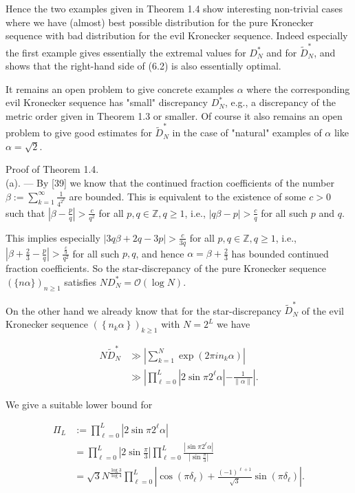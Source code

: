 \documentclass[10pt]{article}
\begin{document}
Hence the two examples given in Theorem 1.4 show interesting non-trivial cases where we have (almost) best possible distribution for the pure Kronecker sequence with bad distribution for the evil Kronecker sequence. Indeed especially the first example gives essentially the extremal values for $D_{N}^{*}$ and for $\widetilde{D}_{N}^{*}$, and shows that the right-hand side of (6.2) is also essentially optimal.

It remains an open problem to give concrete examples $\alpha$ where the corresponding evil Kronecker sequence has "small" discrepancy $D_{N}^{*}$, e.g., a discrepancy of the metric order given in Theorem 1.3 or smaller. Of course it also remains an open problem to give good estimates for $\widetilde{D}_{N}^{*}$ in the case of "natural" examples of $\alpha$ like $\alpha=\sqrt{2}$.

Proof of Theorem 1.4.\\[0pt]
(a). — By [39] we know that the continued fraction coefficients of the number $\beta:=\sum_{k=1}^{\infty} \frac{1}{4^{2^{k}}}$ are bounded. This is equivalent to the existence of some $c>0$ such that $\left|\beta-\frac{p}{q}\right|>\frac{c}{q^{2}}$ for all $p, q \in \mathbb{Z}, q \geqslant 1$, i.e., $|q \beta-p|>\frac{c}{q}$ for all such $p$ and $q$.

This implies especially $|3 q \beta+2 q-3 p|>\frac{c}{3 q}$ for all $p, q \in \mathbb{Z}, q \geqslant 1$, i.e., $\left|\beta+\frac{2}{3}-\frac{p}{q}\right|>\frac{\frac{c}{9}}{q^{2}}$ for all such $p, q$, and hence $\alpha=\beta+\frac{2}{3}$ has bounded continued fraction coefficients. So the star-discrepancy of the pure Kronecker sequence $(\{n \alpha\})_{n \geqslant 1}$ satisfies $N D_{N}^{*}=\mathcal{O}(\log N)$.

On the other hand we already know that for the star-discrepancy $\widetilde{D}_{N}^{*}$ of the evil Kronecker sequence $\left(\left\{n_{k} \alpha\right\}\right)_{k \geqslant 1}$ with $N=2^{L}$ we have

$$
\begin{aligned}
N \widetilde{D}_{N}^{*} & \gg\left|\sum_{k=1}^{N} \exp \left(2 \pi i n_{k} \alpha\right)\right| \\
& \gg\left|\prod_{\ell=0}^{L}\right| 2 \sin \pi 2^{\ell} \alpha\left|-\frac{1}{\|\alpha\|}\right| .
\end{aligned}
$$

We give a suitable lower bound for

$$
\begin{aligned}
\Pi_{L} & :=\prod_{\ell=0}^{L}\left|2 \sin \pi 2^{\ell} \alpha\right| \\
& =\prod_{\ell=0}^{L}\left|2 \sin \frac{\pi}{3}\right| \prod_{\ell=0}^{L} \frac{\left|\sin \pi 2^{\ell} \alpha\right|}{\left|\sin \frac{\pi}{3}\right|} \\
& =\sqrt{3} N^{\frac{\log 3}{\log 4}} \prod_{\ell=0}^{L}\left|\cos \left(\pi \delta_{\ell}\right)+\frac{(-1)^{\ell+1}}{\sqrt{3}} \sin \left(\pi \delta_{\ell}\right)\right| .
\end{aligned}
$$
\end{document}
